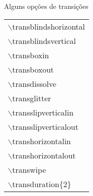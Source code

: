 \begin{frame}[fragile]
  \transblindshorizontal[duration=2, direction=25]

  \begin{block}{Alguns opções de transições}
      \centering
      \begin{tabular}{l}
        $\backslash$transblindshorizontal \\
        $\backslash$transblindsvertical   \\
        $\backslash$transboxin \\
        $\backslash$transboxout \\
        $\backslash$transdissolve \\
        $\backslash$transglitter \\
        $\backslash$transslipverticalin \\
        $\backslash$transslipverticalout \\
        $\backslash$transhorizontalin \\
        $\backslash$transhorizontalout \\
        $\backslash$transwipe \\
        $\backslash$transduration\{2\} \\
      \end{tabular}
  \end{block}
\end{frame}
